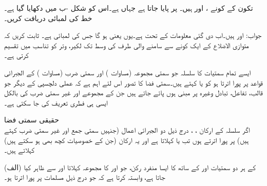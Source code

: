 تکون کے کونے ،  اور  ہیں۔ پر  پایا جاتا ہے جہاں
  ہے۔اس کو شکل -ب میں دکھایا گیا ہے۔خط  کی لمبائی دریافت کریں۔

جواب: اور  ہیں۔اب دی گئی معلومات کے تحت  ہے۔یوں  یعنی  ہو گا جس کی لمبائی  ہے۔
ثابت کریں کہ متوازی الاضلاع کے ایک کونے سے سامنے والی طرف کی وسط تک لکیر، وتر کو  تناسب میں تقسیم کرتی ہے۔

ایسے تمام سمتیات کا سلسلہ  جو سمتی مجموعہ (مساوات ) اور سمتی ضرب (مساوات ) کے الجبرائی قواعد پر پورا اترتا ہو کو  یا   کہتے ہیں۔سمتی فضا کا تصور اس لئے اہم ہے کہ عملی دلچسپی کے دیگر   جو قالب، تفاعل، تبادل وغیرہ پر مبنی ہوں پائے جاتے ہیں جن کے مجموعے اور غیر سمتی ضرب کی بالکل ایسی ہی فطری  تعریف کی جا سکتی ہے۔      

\quad حقیقی سمتی فضا\\
اگر سلسلہ  کے ارکان ، ،  درج ذیل دو الجبرائی اعمال (جنہیں سمتی جمع اور غیر سمتی ضرب کہتے ہیں) پر پورا اترتے ہوں 
  تب   یا  کہلاتا ہے  اور  یہ ارکان (جن کے خصوصیات کچھ بھی ہو سکتے ہیں)   کہلاتے ہیں۔

(الف)\quad {}  کے ہر دو سمتیات  اور  کے ساتھ  کا ایسا منفرد رکن، جو  اور  کا مجموعہ کہلاتا  اور  سے ظاہر کیا جاتا ہے،  وابستہ  کرتا ہے کہ جو درج ذیل مسلمات پر پورا اترتا ہو۔

